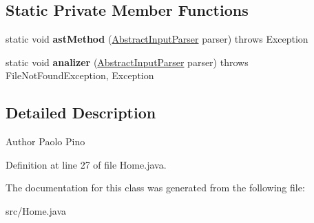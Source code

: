 \subsection*{Static Private Member Functions}
\begin{DoxyCompactItemize}
\item 
\hypertarget{class_home_ac6c6a408dc24c30d02945cd67403d6d1}{static void {\bfseries ast\-Method} (\hyperlink{classinput_parser_1_1_abstract_input_parser}{Abstract\-Input\-Parser} parser)  throws Exception }\label{class_home_ac6c6a408dc24c30d02945cd67403d6d1}

\item 
\hypertarget{class_home_a207d973f0026822784672e07478745aa}{static void {\bfseries analizer} (\hyperlink{classinput_parser_1_1_abstract_input_parser}{Abstract\-Input\-Parser} parser)  throws File\-Not\-Found\-Exception, Exception }\label{class_home_a207d973f0026822784672e07478745aa}

\end{DoxyCompactItemize}


\subsection{Detailed Description}
\begin{DoxyAuthor}{Author}
Paolo Pino 
\end{DoxyAuthor}


Definition at line 27 of file Home.\-java.



The documentation for this class was generated from the following file\-:\begin{DoxyCompactItemize}
\item 
src/Home.\-java\end{DoxyCompactItemize}
